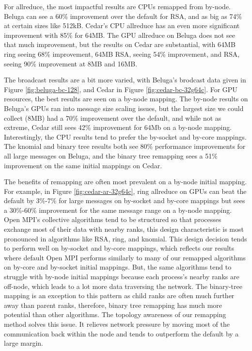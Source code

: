 For allreduce, the most impactful results are \gls{CPU}s remapped from by-node.
Beluga can see a 60\% improvement over the default for \gls{RSA}, and as big as 74\% at certain sizes like 512kB.
Cedar's \gls{CPU} allreduce has an even more significant improvement with 85\% for 64MB.
The \gls{GPU} allreduce on Beluga does not see that much improvement, but the results on Cedar are substantial, with 64MB ring seeing 68\% improvement, 64MB \gls{RSA}, seeing 54\% improvement, and \gls{RSA}, seeing 90\% improvement at 8MB and 16MB.

The broadcast results are a bit more varied, with Beluga's brodcast data given in Figure \ref{fig:beluga-bc-128}, and Cedar in Figure \ref{fig:cedar-bc-32g64c}.
For \gls{GPU} resources, the best results are seen on a by-node mapping.
The by-node results on Beluga's \gls{GPU}s ran into message size scaling issues, but the largest size we could collect (8MB) had a 70\% improvement over the default, and while not as extreme, Cedar still sees 42\% improvement for 64Mb on a by-node mapping.
Interestingly, the \gls{CPU} results tend to prefer the by-socket and by-core mappings. 
The knomial and binary tree results both see 80\% performance improvements for all large messages on Beluga, and the binary tree remapping sees a 51\% improvement on the same initial mappings on Cedar.

The benefits of remapping are often most prevalent on a by-node initial mapping. 
For example, in Figure \ref{fig:cedar-ar-32g64c}, ring allreduce on \gls{GPU}s can beat the default by 3\%-7\% for large messages on by-socket and by-core mappings but sees a 30\%-60\% improvement for the same message range on a by-node mapping.
Open MPI's collective algorithms tend to be structured so that processes exchange most of their data with nearby ranks, this design characteristic is most pronounced in algorithms like \gls{RSA}, ring, and knomial.
This design decision tends to perform well on by-socket and by-core mappings, which reflects our results where default Open MPI performs similarly to many of our remapped algorithms on by-core and by-socket initial mappings.
But, the same algorithms tend to struggle with by-node initial mappings because each process's nearby ranks are off-node, which leads to a lot more data traversing the network.
The binary-tree mapping is an exception to this pattern as child ranks are often much further away than parent ranks, therefore, binary tree remapping has much more potential than other algorithms.
The topology awareness of our remapping method solves this issue. 
It relieves network pressure by moving most of the communication back within the node and tends to outperform the default by a large margin.


